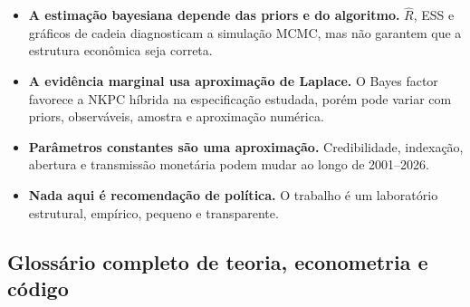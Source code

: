 \documentclass[11pt,a4paper]{article}
\begin{document}
\begin{itemize}
  \item \textbf{A estimação bayesiana depende das priors e do algoritmo.} \(\widehat R\), ESS e
        gráficos de cadeia diagnosticam a simulação MCMC, mas não garantem que a estrutura
        econômica seja correta.
  \item \textbf{A evidência marginal usa aproximação de Laplace.} O Bayes factor favorece a NKPC
        híbrida na especificação estudada, porém pode variar com priors, observáveis, amostra e
        aproximação numérica.
  \item \textbf{Parâmetros constantes são uma aproximação.} Credibilidade, indexação, abertura e
        transmissão monetária podem mudar ao longo de 2001--2026.
  \item \textbf{Nada aqui é recomendação de política.} O trabalho é um laboratório estrutural,
        empírico, pequeno e transparente.
\end{itemize}

\subsection{Glossário completo de teoria, econometria e código}
\end{document}
